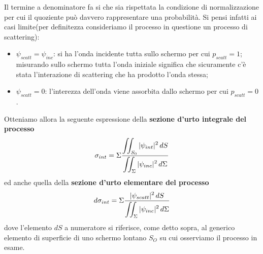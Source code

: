 Il termine a denominatore fa si che sia rispettata la condizione di normalizzazione per cui il quoziente può davvero
rappresentare una probabilità.
Si pensi infatti ai casi limite(per definitezza consideriamo il processo in questione un processo di scattering):
\begin{itemize}
	\item $\psi_{scatt} = \psi_{inc}$: si ha l'onda incidente tutta sullo schermo per cui $ p_{scatt} = 1$;
	misurando sullo schermo tutta l’onda iniziale significa che sicuramente c’è stata l’interazione di
	scattering che ha prodotto l’onda stessa;
	\item $ \psi_{scatt} = 0$: l'interezza dell'onda viene assorbita dallo schermo per cui $ p_{scatt} = 0$.
\end{itemize}
Otteniamo allora la seguente espressione della \textbf{sezione d'urto integrale del processo}
\begin{equation}
	\sigma_{int} = \Sigma \fraclarg{\iint_{S_0} |\psi_{int}|^2 \, dS}{\iint_{\Sigma}|\psi_{inc}|^2 \, d \Sigma}
	\label{eq:integral-interaction-cross-section}
\end{equation}
ed anche quella della \textbf{sezione d'urto elementare del processo}
\begin{equation}
	d \sigma_{int} = \Sigma \fraclarg{|\psi_{scatt}|^2 \, dS}{\iint_{\Sigma}|\psi_{inc}|^2 \, d \Sigma}
	\label{eq:differential-interaction-cross-section}
\end{equation}
dove l'elemento \(dS\) a numeratore si riferisce, come
detto sopra, al generico elemento di superficie di uno schermo lontano
\(S_O\) su cui osserviamo il processo in esame.
%
